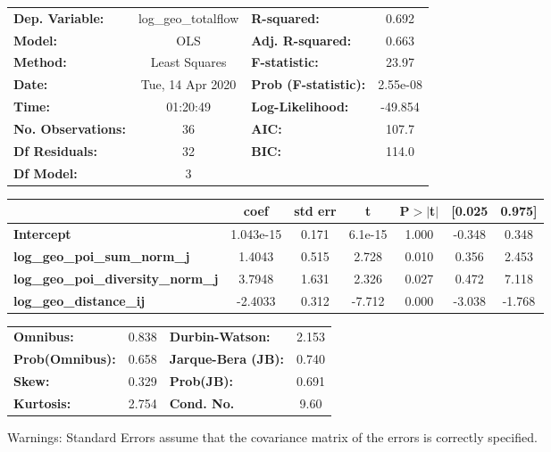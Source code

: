 \begin{center}
\begin{tabular}{lclc}
\toprule
\textbf{Dep. Variable:}                    & log\_geo\_totalflow & \textbf{  R-squared:         } &     0.692   \\
\textbf{Model:}                            &         OLS         & \textbf{  Adj. R-squared:    } &     0.663   \\
\textbf{Method:}                           &    Least Squares    & \textbf{  F-statistic:       } &     23.97   \\
\textbf{Date:}                             &   Tue, 14 Apr 2020  & \textbf{  Prob (F-statistic):} &  2.55e-08   \\
\textbf{Time:}                             &       01:20:49      & \textbf{  Log-Likelihood:    } &   -49.854   \\
\textbf{No. Observations:}                 &            36       & \textbf{  AIC:               } &     107.7   \\
\textbf{Df Residuals:}                     &            32       & \textbf{  BIC:               } &     114.0   \\
\textbf{Df Model:}                         &             3       & \textbf{                     } &             \\
\bottomrule
\end{tabular}
\begin{tabular}{lcccccc}
                                           & \textbf{coef} & \textbf{std err} & \textbf{t} & \textbf{P$> |$t$|$} & \textbf{[0.025} & \textbf{0.975]}  \\
\midrule
\textbf{Intercept}                         &    1.043e-15  &        0.171     &   6.1e-15  &         1.000        &       -0.348    &        0.348     \\
\textbf{log\_geo\_poi\_sum\_norm\_j}       &       1.4043  &        0.515     &     2.728  &         0.010        &        0.356    &        2.453     \\
\textbf{log\_geo\_poi\_diversity\_norm\_j} &       3.7948  &        1.631     &     2.326  &         0.027        &        0.472    &        7.118     \\
\textbf{log\_geo\_distance\_ij}            &      -2.4033  &        0.312     &    -7.712  &         0.000        &       -3.038    &       -1.768     \\
\bottomrule
\end{tabular}
\begin{tabular}{lclc}
\textbf{Omnibus:}       &  0.838 & \textbf{  Durbin-Watson:     } &    2.153  \\
\textbf{Prob(Omnibus):} &  0.658 & \textbf{  Jarque-Bera (JB):  } &    0.740  \\
\textbf{Skew:}          &  0.329 & \textbf{  Prob(JB):          } &    0.691  \\
\textbf{Kurtosis:}      &  2.754 & \textbf{  Cond. No.          } &     9.60  \\
\bottomrule
\end{tabular}
\end{center}

Warnings: \newline
 [1] Standard Errors assume that the covariance matrix of the errors is correctly specified.